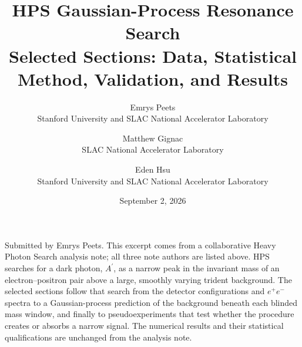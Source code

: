 \documentclass[11pt]{article}
\title{\vspace{1.3in}HPS Gaussian-Process Resonance Search\\[0.5em]
\large Selected Sections: Data, Statistical Method, Validation, and Results}
\author{
Emrys Peets\\Stanford University and SLAC National Accelerator Laboratory
\and
Matthew Gignac\\SLAC National Accelerator Laboratory
\and
Eden Hsu\\Stanford University and SLAC National Accelerator Laboratory
}
\date{September 2, 2026}
\begin{document}
\hypersetup{pageanchor=false}
\begin{titlepage}
\maketitle
\vfill
\begin{center}
\begin{minipage}{0.84\textwidth}
\small
Submitted by Emrys Peets. This excerpt comes from a collaborative Heavy Photon Search
analysis note; all three note authors are listed above. HPS searches for a dark photon,
$A^\prime$, as a narrow peak in the invariant mass of an electron--positron pair above
a large, smoothly varying trident background. The selected sections follow that search
from the detector configurations and $e^+e^-$ spectra to a Gaussian-process prediction
of the background beneath each blinded mass window, and finally to pseudoexperiments
that test whether the procedure creates or absorbs a narrow signal. The numerical
results and their statistical qualifications are unchanged from the analysis note.
\end{minipage}
\end{center}
\vfill
\thispagestyle{empty}
\end{titlepage}

\hypersetup{pageanchor=true}
\setcounter{page}{1}
\setcounter{section}{1}
\setcounter{tocdepth}{2}
\tableofcontents
\clearpage


\FloatBarrier
\clearpage


\FloatBarrier
\clearpage


\FloatBarrier
\clearpage


\FloatBarrier

\clearpage

\FloatBarrier

\clearpage


\end{document}

